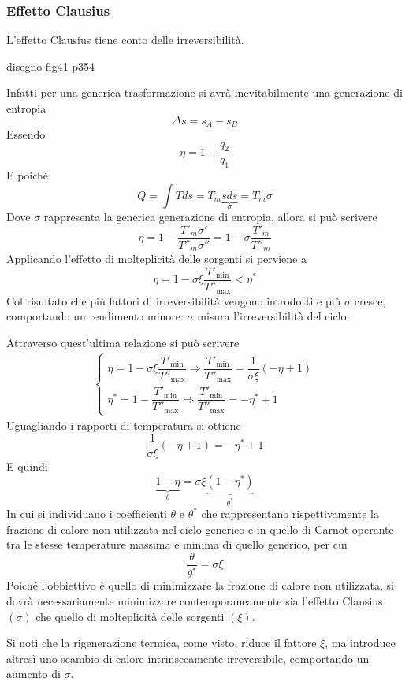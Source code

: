 \subsubsection{Effetto Clausius}
\begin{adjustwidth}{2in}{}
	L'effetto Clausius tiene conto delle irreversibilità.
	
	disegno fig41 p354
	
	Infatti per una generica trasformazione si avrà inevitabilmente una generazione di entropia 
	\[\Delta s = s_A-s_B\]
	Essendo 
	\[\eta = 1-\dfrac{q_2}{q_1}\]
	E poiché 
	\[Q = \int Tds = T_m\underbrace{sds}_{\sigma} = T_m\sigma\]
	Dove $\sigma$ rappresenta la generica generazione di entropia, allora si può scrivere 
	\[\eta = 1-\dfrac{T'_m\sigma'}{T''_m\sigma''} = 1-\sigma\dfrac{T'_m}{T''_m}\]
	Applicando l'effetto di molteplicità delle sorgenti si perviene a
	\[\eta =1-\sigma\xi\dfrac{T'_{\min}}{T''_{\max}}<\eta^*\]
	Col risultato che più fattori di irreversibilità vengono introdotti e più $\sigma$ cresce, comportando un rendimento minore: $\sigma$ misura l'irreversibilità del ciclo. \newline 
	
	Attraverso quest'ultima relazione si può scrivere
	\[\begin{aligned}
		\begin{cases}
			\eta =1-\sigma\xi\dfrac{T'_{\min}}{T''_{\max}} \Rightarrow \dfrac{T'_{\min}}{T''_{\max}}  = \dfrac{1}{\sigma\xi}(-\eta+1)\\
			\eta^*  =1-\dfrac{T'_{\min}}{T''_{\max}} \Rightarrow \dfrac{T'_{\min}}{T''_{\max}}  = -\eta^*+1
		\end{cases}
	\end{aligned}\]
	Uguagliando i rapporti di temperatura si ottiene 
	\[\dfrac{1}{\sigma\xi}(-\eta+1) = -\eta^*+1\]
	E quindi
	\[\underbrace{1-\eta}_{\theta} = \sigma\xi\underbrace{(1-\eta^*)}_{\theta^*}\]
	In cui si individuano i coefficienti $\theta$ e $\theta^*$ che rappresentano rispettivamente la frazione di calore non utilizzata nel ciclo generico e in quello di Carnot operante tra le stesse temperature massima e minima di quello generico, per cui
	\[\dfrac{\theta}{\theta^*}=\sigma\xi\]
	Poiché l'obbiettivo è quello di minimizzare la frazione di calore non utilizzata, si dovrà necessariamente minimizzare contemporaneamente sia l'effetto Clausius $(\sigma)$ che quello di molteplicità delle sorgenti $(\xi)$. \newline 
	
	Si noti che la rigenerazione termica, come visto, riduce il fattore $\xi$, ma introduce altresì uno scambio di calore intrinsecamente irreversibile, comportando un aumento di $\sigma$.
\end{adjustwidth}